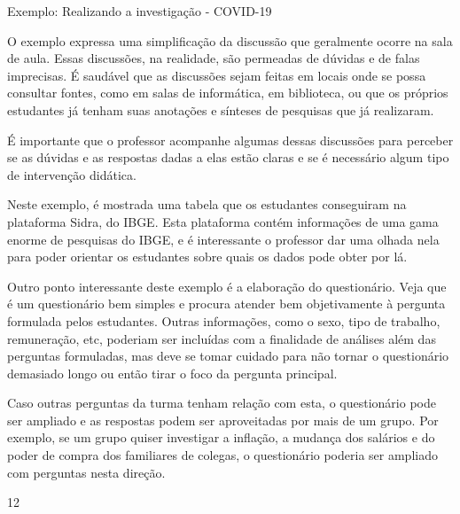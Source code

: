\clearpage
\begin{sugestions}{Exemplo: Realizando a investigação - COVID-19}
{
  O exemplo expressa uma simplificação da discussão que geralmente ocorre na sala de aula. Essas discussões, na realidade, são permeadas de dúvidas e de falas imprecisas. É saudável que as discussões sejam feitas em locais onde se possa consultar fontes, como em salas de informática, em biblioteca, ou que os próprios estudantes já tenham suas anotações e sínteses de pesquisas que já realizaram.

  É importante que o professor acompanhe algumas dessas discussões para perceber se as dúvidas e as respostas dadas a elas estão claras e se é necessário algum tipo de intervenção didática.

  Neste exemplo, é mostrada uma tabela que os estudantes conseguiram na plataforma Sidra, do IBGE. Esta plataforma contém informações de uma gama enorme de pesquisas do IBGE, e é interessante o professor dar uma olhada nela para poder orientar os estudantes sobre quais os dados pode obter por lá.

  Outro ponto interessante deste exemplo é a elaboração do questionário. Veja que é um questionário bem simples e procura atender bem objetivamente à pergunta formulada pelos estudantes. Outras informações, como o sexo, tipo de trabalho, remuneração, etc, poderiam ser incluídas com a finalidade de análises além das perguntas formuladas, mas deve se tomar cuidado para não tornar o questionário demasiado longo ou então tirar o foco da pergunta principal.

  Caso outras perguntas da turma tenham relação com esta, o questionário pode ser ampliado e as respostas podem ser aproveitadas por mais de um grupo. Por exemplo, se um grupo quiser investigar a inflação, a mudança dos salários e do poder de compra dos familiares de colegas, o questionário poderia ser ampliado com perguntas nesta direção.

}{1}{2}
\end{sugestions}
